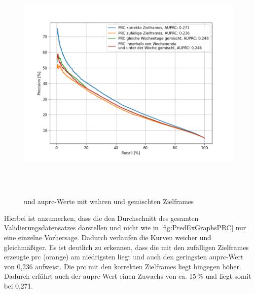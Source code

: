 \begin{figure}[h]
    \centering
    \includegraphics[width=1.0\textwidth,height=12cm,keepaspectratio=true]{content/images/PRCValGetrennt.png}
    \caption{ und \acrshort{auprc}-Werte mit wahren und gemischten Zielframes}
    \label{fig:PRCValGetrennt}
\end{figure}

Hierbei ist anzumerken, dass die  den Durchschnitt des gesamten Validierungsdatensatzes darstellen und nicht wie in \autoref{fig:PredExGraphsPRC} nur eine einzelne Vorhersage.
Dadurch verlaufen die Kurven weicher und gleichmäßiger.
Es ist deutlich zu erkennen, dass die mit den zufälligen Zielframes erzeugte \acrshort{prc} (orange) am niedrigsten liegt und auch den geringsten \acrshort{auprc}-Wert von 0,236 aufweist.
Die \acrshort{prc} mit den korrekten Zielframes liegt hingegen höher.
Dadurch erfährt auch der \acrshort{auprc}-Wert einen Zuwachs von ca. 15\,\% und liegt somit bei 0,271.

